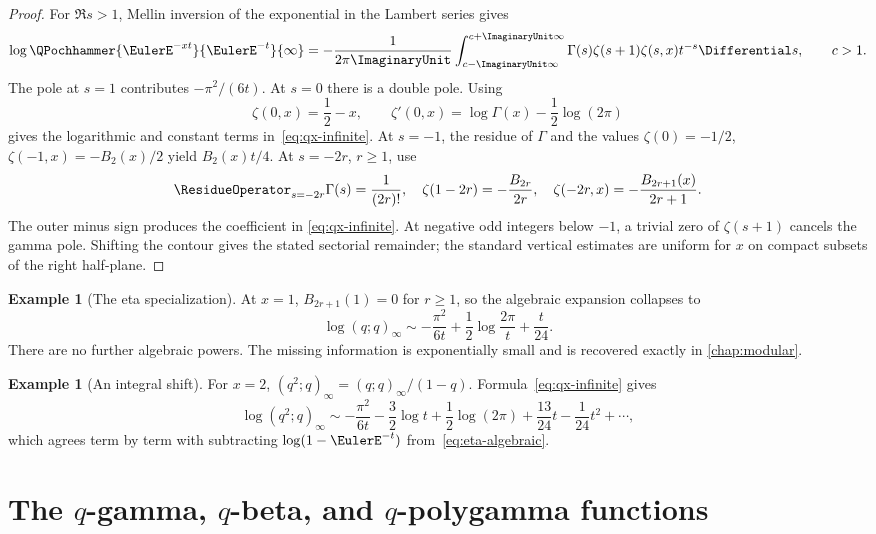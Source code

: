 \documentclass[11pt,oneside]{article}
\theoremstyle{definition}
\newtheorem{example}[theorem]{Example}
\theoremstyle{remark}
\let\reporttopsection\section
\let\reportsubsection\subsection
\let\chapter\reporttopsection
\let\section\reportsubsection
\begin{document}
\begin{proof}
For $\Re s>1$, Mellin inversion of the exponential in the Lambert series gives
\begin{equation}\label{eq:qx-mellin}
 \log\QPochhammer{\EulerE^{-xt}}{\EulerE^{-t}}{\infty}
 =-\frac1{2\pi\ImaginaryUnit}\int_{c-\ImaginaryUnit\infty}^{c+\ImaginaryUnit\infty}
 \Gamma(s)\zeta(s+1)\zeta(s,x)t^{-s}\Differential s,
 \qquad c>1.
\end{equation}
The pole at $s=1$ contributes $-\pi^2/(6t)$.  At $s=0$ there is a double pole.
Using
\[
 \zeta(0,x)=\frac12-x,
 \qquad
 \zeta'(0,x)=\log\Gamma(x)-\frac12\log(2\pi)
\]
gives the logarithmic and constant terms in~\eqref{eq:qx-infinite}.
At $s=-1$, the residue of $\Gamma$ and the values
$\zeta(0)=-1/2$, $\zeta(-1,x)=-B_2(x)/2$ yield $B_2(x)t/4$.
At $s=-2r$, $r\ge1$, use
\[
 \ResidueOperator_{s=-2r}\Gamma(s)=\frac1{(2r)!},
 \quad
 \zeta(1-2r)=-\frac{B_{2r}}{2r},
 \quad
 \zeta(-2r,x)=-\frac{B_{2r+1}(x)}{2r+1}.
\]
The outer minus sign produces the coefficient in
\eqref{eq:qx-infinite}.  At negative odd integers below $-1$, a trivial zero of
$\zeta(s+1)$ cancels the gamma pole.  Shifting the contour gives the stated
sectorial remainder; the standard vertical estimates are uniform for $x$ on
compact subsets of the right half-plane.
\end{proof}

\begin{example}[The eta specialization]
At $x=1$, $B_{2r+1}(1)=0$ for $r\ge1$, so the algebraic expansion collapses to
\begin{equation}\label{eq:eta-algebraic}
 \log(q;q)_\infty
 \sim-\frac{\pi^2}{6t}+\frac12\log\frac{2\pi}{t}+\frac{t}{24}.
\end{equation}
There are no further algebraic powers.  The missing information is
exponentially small and is recovered exactly in \cref{chap:modular}.
\end{example}

\begin{example}[An integral shift]
For $x=2$,
\((q^2;q)_\infty=(q;q)_\infty/(1-q)
\).  Formula~\eqref{eq:qx-infinite} gives
\[
 \log(q^2;q)_\infty
 \sim-\frac{\pi^2}{6t}-\frac32\log t+\frac12\log(2\pi)
 +\frac{13}{24}t-\frac1{24}t^2+\cdots,
\]
which agrees term by term with subtracting
$\log(1-\EulerE^{-t})$ from~\eqref{eq:eta-algebraic}.
\end{example}

\chapter{The \texorpdfstring{$q$}{q}-gamma, \texorpdfstring{$q$}{q}-beta, and \texorpdfstring{$q$}{q}-polygamma functions}\label{chap:qgamma-exp}
\end{document}
